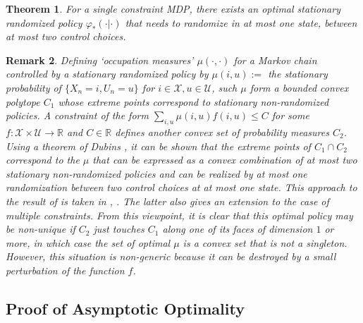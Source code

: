 \documentclass[12pt]{article}
\newtheorem{theorem}{Theorem}[section]
\newtheorem{remark}[theorem]{Remark}
\numberwithin{equation}{section}
\newcommand{\1}{\textbf{1}}
\newcommand{\U}{\mathcal{U}}
\newcommand{\X}{\mathcal{X}}
\begin{document}
\begin{theorem}\label{Ross} 
For a single constraint MDP, there exists an optimal stationary randomized policy $\varphi_*(\cdot|\cdot)$ that needs to randomize in at most one state, between at most two control choices. \end{theorem}

\begin{remark} Defining `occupation measures' $\mu(\cdot,\cdot)$ for a Markov chain controlled by a stationary randomized policy by $\mu(i,u) :=$ the stationary probability of $\{X_n = i, U_n = u\}$ for $i \in \X, u \in \U$, such $\mu$ form a bounded convex polytope $C_1$ whose extreme points correspond to stationary non-randomized policies. A constraint of the form $\sum_{i,u}\mu(i,u)f(i,u) \leq C$ for some $f: \X\times\U \to \mathbb{R}$ and $C \in \mathbb{R}$ defines another convex set of probability measures $C_2$. Using a theorem of Dubins \cite{Dubins}, it can be shown that the extreme points of $C_1\cap C_2$ correspond to the $\mu$ that can be expressed as a convex combination of at most two stationary non-randomized policies and can be realized by at most one randomization between two control choices at at most one state. This approach to the result of \cite{Ross} is taken in \cite{BorkarConstrained}, \cite{BorkarConstraint}. The latter also gives an extension to the case of multiple constraints. From this viewpoint, it is clear that this optimal policy may be non-unique if $C_2$ just touches $C_1$ along one of its faces of dimension $1$ or more, in which case the set of optimal $\mu$ is a convex set that is not a singleton. However, this situation is non-generic because it can be destroyed by a small perturbation of the function $f$.
\end{remark}


\subsection{Proof of Asymptotic Optimality}
\end{document}
